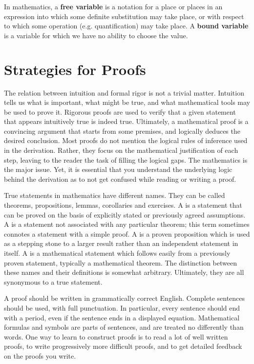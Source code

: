 In mathematics, a \textbf{free variable} is a notation for a place or places in an expression into which some definite substitution may take place, or with respect to which some operation (e.g. quantification) may take place. 
A \textbf{bound variable} is a variable for which we have no ability to choose the value.


\section{Strategies for Proofs}

The relation between intuition and formal rigor is not a trivial matter.
Intuition tells us what is important, what might be true, and what mathematical tools may be used to prove it.
Rigorous proofs are used to verify that a given statement that appears intuitively true is indeed true.
Ultimately, a mathematical proof is a convincing argument that starts from some premises, and logically deduces the desired conclusion.
Most proofs do not mention the logical rules of inference used in the derivation.
Rather, they focus on the mathematical justification of each step, leaving to the reader the task of filling the logical gaps.
The mathematics is the major issue.
Yet, it is essential that you understand the underlying logic behind the derivation as to not get confused while reading or writing a proof.

True statements in mathematics have different names.
They can be called theorems, propositions, lemmas, corollaries and exercises.
A  is a statement that can be proved on the basis of explicitly stated or previously agreed assumptions.
A  is a statement not associated with any particular theorem; this term sometimes connotes a statement with a simple proof.
A  is a proven proposition which is used as a stepping stone to a larger result rather than an independent statement in itself.
A  is a mathematical statement which follows easily from a previously proven statement, typically a mathematical theorem. 
The distinction between these names and their definitions is somewhat arbitrary.
Ultimately, they are all synonymous to a true statement.

A proof should be written in grammatically correct English.
Complete sentences should be used, with full punctuation.
In particular, every sentence should end with a period, even if the sentence ends in a displayed equation.
Mathematical formulas and symbols are parts of sentences, and are treated no differently than words.
One way to learn to construct proofs is to read a lot of well written proofs, to write progressively more difficult proofs, and to get detailed feedback on the proofs you write.


